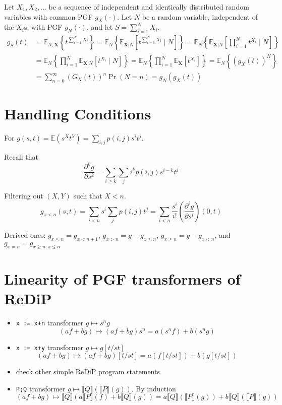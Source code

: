 \documentclass{article}
\newcommand{\E}{\mathbb{E}}
\renewcommand{\S}[1]{ \llbracket #1 \rrbracket }
\begin{document}
Let \(X_1, X_2, \ldots\) be a sequence of independent and identically distributed random variables with common PGF \(g_X(\cdot)\). Let \(N\) be a random variable, independent of the \(X_i\)s, with PGF \(g_N(\cdot)\), and let \(S=\sum_{i=1}^N X_i\).
\begin{align*}
	g_{S}(t) & = \E_{N,\mathbf{X}}\left\{ t^{\sum_{i=1}^N X_i} \right\}
	= \E_N\left\{ \E_{\mathbf{X}|N}\left[ t^{\sum_{i=1}^N X_i} \mid N \right] \right\}
	= \E_N\left\{ \E_{\mathbf{X}|N}\left[ \prod_{i=1}^N t^{X_i} \mid N \right] \right\}             \\
	         & = \E_N\left\{ \prod_{i=1}^N \E_{\mathbf{X}|N}\left[  t^{X_i} \mid N \right] \right\}
	= \E_N\left\{ \prod_{i=1}^N \E_{\mathbf{X}}\left[  t^{X_i} \right] \right\}
	= \E_N\left\{ {(g_X(t))}^N \right\}                                                             \\
	         & = \sum_{n=0}^{\infty} {(G_X(t))}^n \Pr(N=n)
	= g_N(g_X(t))
\end{align*}

\section{Handling Conditions}

For \(g(s,t) = \E(s^X t^Y) = \sum_{i,j} p(i,j)s^i t^j\).

\noindent Recall that
\[
	\frac{\partial^k g}{\partial s^k} = \sum_{i\geq k}\sum_j i^{\underline k} p(i,j) s^{i-k} t^j
\]

\noindent Filtering out \((X,Y)\) such that \(X<n\).
\[
	g_{x<n}(s,t)
	= \sum_{i < n} s^i \sum_j p(i,j) t^j
	= \sum_{i < n} \frac{s^i}{i!} \left(\frac{\partial^i g}{\partial s^i}\right)(0,t)
\]

\noindent Derived ones: \(g_{x\leq n} = g_{x<n+1}\), \(g_{x>n} = g-g_{x\leq n}\), \(g_{x\geq n} = g-g_{x<n}\), and \(g_{x=n}=g_{x\geq n,x\leq n}\)

\pagebreak
\section{Linearity of PGF transformers of ReDiP}

\begin{itemize}
	\item \texttt{x := x+n} transformer \(g\mapsto s^n g\)
	      \[
		      (af + bg) \mapsto (af + bg)s^n = a(s^n f) + b(s^n g)
	      \]
	\item \texttt{x := x+y} transformer \(g\mapsto g[t/st]\)
	      \[
		      (af + bg) \mapsto (af + bg)[t/st] = a(f[t/st]) + b(g[t/st])
	      \]
	\item check other simple ReDiP program statements.
	\item \texttt{P;Q} transformer \(g\mapsto \S{Q}(\S{P}(g))\). By induction
	      \[
		      (af+bg) \mapsto \S{Q}(a\S{P}(f) + b\S{Q}(g)) = a\S{Q}(\S{P}(g)) + b \S{Q}(\S{P}(g))
	      \]
\end{itemize}
\end{document}

